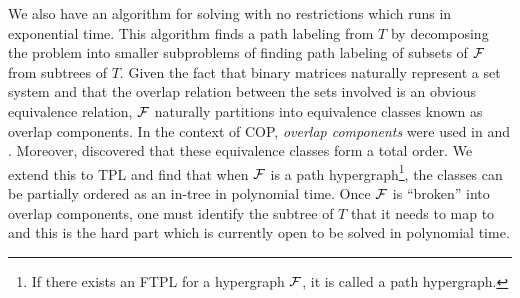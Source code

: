 \documentclass[MS]             %
              {iitmdiss_as}    %
\begin{document}
We also have an algorithm for solving {\CFTPL} with no restrictions
which runs in exponential time. 
This algorithm finds a path labeling from $T$ by decomposing the
problem into smaller subproblems of finding path labeling of subsets
of ${\cal F}$ from subtrees of $T$. Given the fact that binary matrices
naturally represent a set
system %
and that the overlap relation between the sets involved is an obvious
equivalence relation, ${\cal F}$ naturally partitions into equivalence
classes known as overlap components. In the context of COP, {\em overlap
components} were used in \cite{wlh02} and \cite{kklv10}. Moreover,
\cite{nsnrs09} discovered that these equivalence classes form a total
order. We extend this to TPL and find that when ${\cal F}$ is a path
hypergraph\footnote{If there exists an FTPL for a hypergraph ${\cal F}$, it
  is called a path hypergraph.}, the classes can be partially ordered
as an in-tree in polynomial time. Once ${\cal F}$ is
``broken'' into overlap components, one must identify the subtree of
$T$ that it needs to map to and this is the hard part which is
currently open to be solved in polynomial time.




\end{document}
